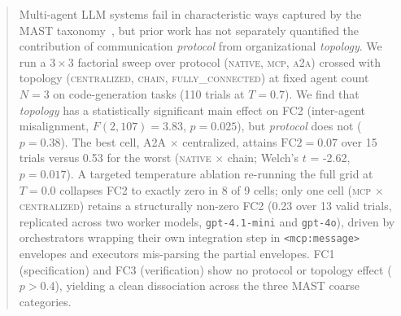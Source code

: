 \documentclass{article}
\begin{document}

\printAffiliationsAndNotice{}

\begin{abstract}
Multi-agent LLM systems fail in characteristic ways captured by the MAST
taxonomy~\cite{mast2024}, but prior work has not separately quantified
the contribution of communication \emph{protocol} from organizational
\emph{topology}. We run a $3 \times 3$ factorial sweep over protocol
(\textsc{native}, \textsc{mcp}, \textsc{a2a}) crossed with topology
(\textsc{centralized}, \textsc{chain}, \textsc{fully\_connected}) at fixed
agent count $N=3$ on code-generation tasks (110 trials at $T=0.7$). We
find that \emph{topology} has a statistically significant main effect on
FC2 (inter-agent misalignment, $F(2,107) = 3.83$, $p = 0.025$), but
\emph{protocol} does not ($p = 0.38$). The best cell, A2A $\times$
centralized, attains $\text{FC2} = 0.07$ over 15 trials versus 0.53 for
the worst (\textsc{native} $\times$ chain; Welch's $t$ = -2.62, $p = 0.017$). A
targeted temperature ablation re-running the full grid at $T=0.0$
collapses FC2 to exactly zero in 8 of 9 cells; only one cell
(\textsc{mcp} $\times$ \textsc{centralized}) retains a structurally
non-zero FC2 (0.23 over 13 valid trials, replicated across two worker
models, \texttt{gpt-4.1-mini} and \texttt{gpt-4o}), driven by
orchestrators wrapping their own integration step in
\texttt{<mcp:message>} envelopes and executors mis-parsing the
partial envelopes. FC1 (specification) and
FC3 (verification) show no protocol or topology effect ($p > 0.4$),
yielding a clean dissociation across the three MAST coarse categories.
\end{abstract}









\end{document}
